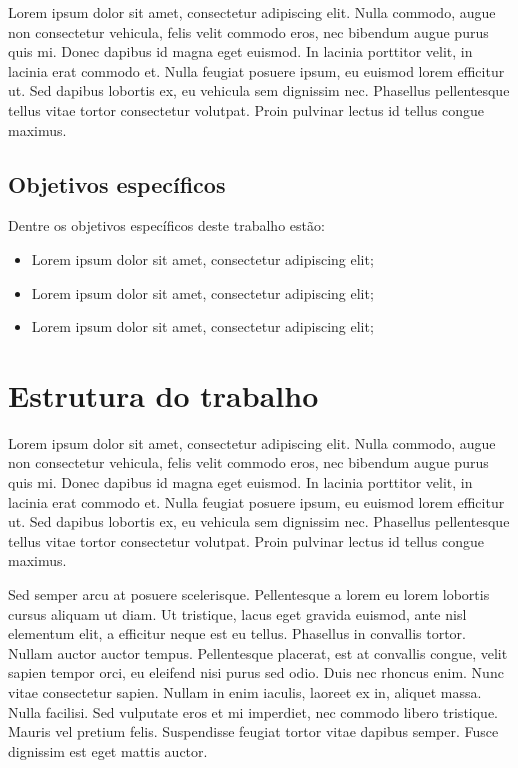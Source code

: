 \documentclass[brazil,hardcopy,openany,a5paper]{ufscthesis}
\begin{document}
	Lorem ipsum dolor sit amet, consectetur adipiscing elit. Nulla commodo, augue non consectetur vehicula, felis velit commodo eros, nec bibendum augue purus quis mi. Donec dapibus id magna eget euismod. In lacinia porttitor velit, in lacinia erat commodo et. Nulla feugiat posuere ipsum, eu euismod lorem efficitur ut. Sed dapibus lobortis ex, eu vehicula sem dignissim nec. Phasellus pellentesque tellus vitae tortor consectetur volutpat. Proin pulvinar lectus id tellus congue maximus.
	
		\subsection{Objetivos específicos}
	
	Dentre os objetivos específicos deste trabalho estão:

		\begin{itemize}
			\item Lorem ipsum dolor sit amet, consectetur adipiscing elit;
			\item Lorem ipsum dolor sit amet, consectetur adipiscing elit;
			\item Lorem ipsum dolor sit amet, consectetur adipiscing elit;
		\end{itemize}
	
	\section{Estrutura do trabalho}
	
	Lorem ipsum dolor sit amet, consectetur adipiscing elit. Nulla commodo, augue non consectetur vehicula, felis velit commodo eros, nec bibendum augue purus quis mi. Donec dapibus id magna eget euismod. In lacinia porttitor velit, in lacinia erat commodo et. Nulla feugiat posuere ipsum, eu euismod lorem efficitur ut. Sed dapibus lobortis ex, eu vehicula sem dignissim nec. Phasellus pellentesque tellus vitae tortor consectetur volutpat. Proin pulvinar lectus id tellus congue maximus.

	Sed semper arcu at posuere scelerisque. Pellentesque a lorem eu lorem lobortis cursus aliquam ut diam. Ut tristique, lacus eget gravida euismod, ante nisl elementum elit, a efficitur neque est eu tellus. Phasellus in convallis tortor. Nullam auctor auctor tempus. Pellentesque placerat, est at convallis congue, velit sapien tempor orci, eu eleifend nisi purus sed odio. Duis nec rhoncus enim. Nunc vitae consectetur sapien. Nullam in enim iaculis, laoreet ex in, aliquet massa. Nulla facilisi. Sed vulputate eros et mi imperdiet, nec commodo libero tristique. Mauris vel pretium felis. Suspendisse feugiat tortor vitae dapibus semper. Fusce dignissim est eget mattis auctor.
\end{document}
